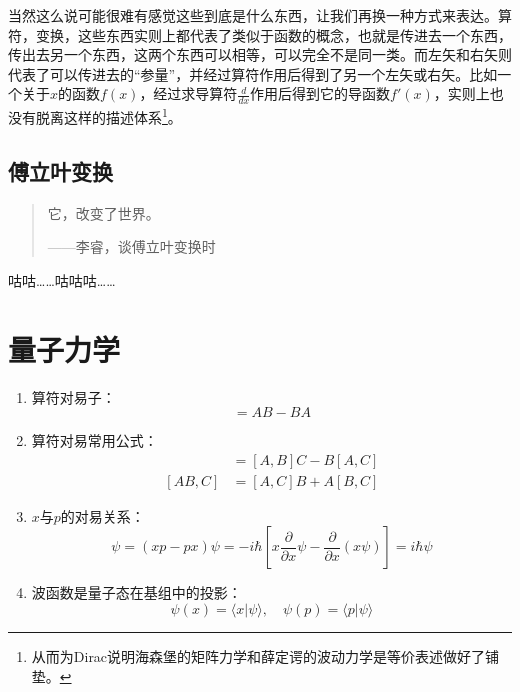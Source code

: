 \documentclass{article}
\numberwithin{equation}{section}
\begin{document}
    当然这么说可能很难有感觉这些到底是什么东西，让我们再换一种方式来表达。算符，变换，这些东西实则上都代表了类似于函数的概念，也就是传进去一个东西，传出去另一个东西，这两个东西可以相等，可以完全不是同一类。而左矢和右矢则代表了可以传进去的``参量''，并经过算符作用后得到了另一个左矢或右矢。比如一个关于$x$的函数$f(x)$，经过求导算符$\frac{d }{d x} $作用后得到它的导函数$f'(x)$，实则上也没有脱离这样的描述体系\footnote{从而为Dirac说明海森堡的矩阵力学和薛定谔的波动力学是等价表述做好了铺垫。}。

    \subsection{傅立叶变换}
  \begin{quote}
    它，改变了世界。
    \begin{flushright}
      ——李睿，谈傅立叶变换时
    \end{flushright}
  \end{quote}     
  咕咕……咕咕咕……

    \section{量子力学}

    \begin{enumerate}
    \item 算符对易子：
  \begin{equation}
  [A,B] = AB - BA
  \end{equation}

  \item 算符对易常用公式：
  \begin{align}
  [A,BC]& = [A,B]C - B[A,C]\\
  [AB,C]& = [A,C]B + A[B,C]
  \end{align}

  \item $x$与$p$的对易关系：
  \begin{equation}
  [x,p]\psi=(xp-px)\psi = -i\hbar[x \frac{\partial}{\partial x}\psi-\frac{\partial}{\partial x}(x\psi)]= i\hbar \psi
  \end{equation}

  \item 波函数是量子态在基组中的投影：
  \begin{equation}
  \psi (x) = \langle x | \psi \rangle , \quad \psi(p) = \langle p | \psi \rangle
  \end{equation} 
\end{enumerate}
  
\end{document}
